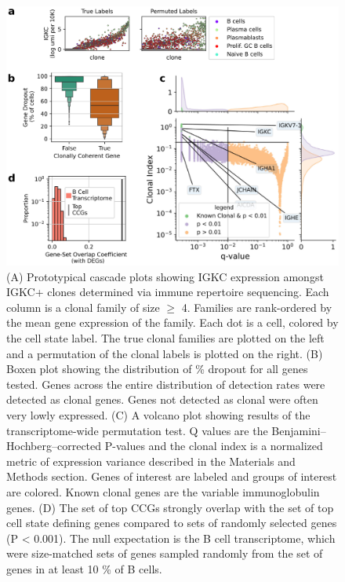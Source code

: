 \begin{figure}[hbt!]
\centering
\includegraphics[width=14cm, keepaspectratio]{figs/paper2/fig4_bcd.png}
\caption[Clonal transcriptional programs are strongly enriched for fate determining genes.]{(A) Prototypical cascade plots showing IGKC expression amongst IGKC+ clones determined via immune repertoire sequencing. Each column is a clonal family of size $\geq$ 4. Families are rank-ordered by the mean gene expression of the family. Each dot is a cell, colored by the cell state label. The true clonal families are plotted on the left and a permutation of the clonal labels is plotted on the right. (B) Boxen plot showing the distribution of \% dropout for all genes tested. Genes across the entire distribution of detection rates were detected as clonal genes. Genes not detected as clonal were often very lowly expressed. (C) A volcano plot showing results of the transcriptome-wide permutation test. Q values are the Benjamini–Hochberg–corrected P-values and the clonal index is a normalized metric of expression variance described in the Materials and Methods section. Genes of interest are labeled and groups of interest are colored. Known clonal genes are the variable immunoglobulin genes. (D) The set of top CCGs strongly overlap with the set of top cell state defining genes compared to sets of randomly selected genes (P < 0.001). The null expectation is the B cell transcriptome, which were size-matched sets of genes sampled randomly from the set of genes in at least 10 \% of B cells.}
\label{fig:paper2_fig_4}
\end{figure}


